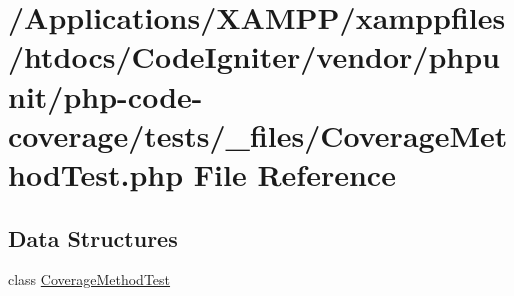 \hypertarget{php-code-coverage_2tests_2__files_2_coverage_method_test_8php}{}\section{/\+Applications/\+X\+A\+M\+P\+P/xamppfiles/htdocs/\+Code\+Igniter/vendor/phpunit/php-\/code-\/coverage/tests/\+\_\+files/\+Coverage\+Method\+Test.php File Reference}
\label{php-code-coverage_2tests_2__files_2_coverage_method_test_8php}
\subsection*{Data Structures}
\begin{DoxyCompactItemize}
\item 
class \mbox{\hyperlink{class_coverage_method_test}{Coverage\+Method\+Test}}
\end{DoxyCompactItemize}
